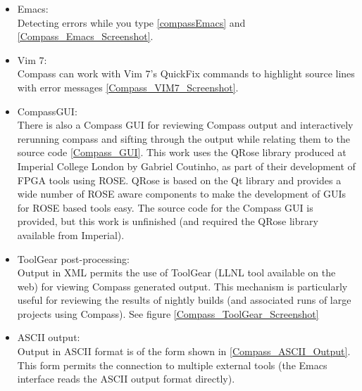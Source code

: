 \begin{itemize}
   \item Emacs: \\
         Detecting errors while you type \ref{compassEmacs} and \ref{Compass_Emacs_Screenshot}.

   \item Vim 7: \\
         Compass can work with Vim 7's QuickFix commands to
         highlight source lines with error messages \ref{Compass_VIM7_Screenshot}. 

   \item CompassGUI: \\
         There is also a Compass GUI for reviewing Compass output and interactively
         rerunning compass and sifting through the output while relating them to the source
         code \ref{Compass_GUI}. This work uses the QRose library produced at Imperial College
         London by Gabriel Coutinho, as part of their development of FPGA tools using ROSE.
         QRose is based on the Qt library and provides a wide number of ROSE aware components
         to make the development of GUIs for ROSE based tools easy.  The source code for the 
         Compass GUI is provided, but this work is unfinished (and required the QRose library
         available from Imperial).

   \item ToolGear post-processing: \\
         Output in XML permits the use of ToolGear (LLNL tool available on the web) for
         viewing Compass generated output.  This mechanism is particularly useful for reviewing
         the results of nightly builds (and associated runs of large projects using
         Compass). See figure \ref{Compass_ToolGear_Screenshot}

   \item ASCII output: \\
         Output in ASCII format is of the form shown in \ref{Compass_ASCII_Output}.  This
         form permits the connection to multiple external tools (the Emacs interface reads
         the ASCII output format directly).
 
\end{itemize}


